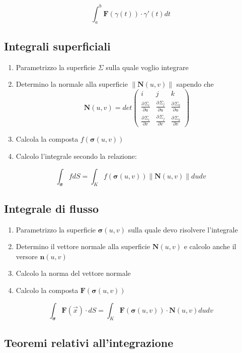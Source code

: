 \documentclass[10pt,a4paper]{report}
\newcommand{\pdv}[3]{\frac{\partial^{#2} #1}{\partial #3^{#2}}}
\newcommand{\norm}[1]{\left\lVert {#1} \right\rVert}
\begin{document}
		\[ \int_{a}^{b} \mathbf{F}(\gamma (t)) \cdot \gamma '(t) dt \]
		
		\subsection*{Integrali \textbf{superficiali}}
			\begin{enumerate}
				\item Parametrizzo la superficie $ \Sigma $ sulla quale voglio integrare
				\item Determino la normale alla superficie $\norm{\mathbf{N}(u,v)} $ sapendo che
                \[ \mathbf{N}(u,v) = det \left(\begin{array}{ccc} i & j & k\\ \pdv{\Sigma_{i} }{}{u} & \pdv{\Sigma_{j}}{}{u} & \pdv{\Sigma_{k}}{}{u} \\ \pdv{\Sigma_{i}}{}{v} & \pdv{\Sigma_{j}}{}{v} & \pdv{\Sigma_{k}}{}{v} \end{array}\right) \]
				\item Calcola la composta $f(\mathbf{\sigma} (u,v))$
				\item Calcolo l'integrale secondo la relazione:
			\end{enumerate}
		\[ \int_{\mathbf{\sigma}} fdS = \int_{K} f(\mathbf{\sigma} (u,v)) \norm{\mathbf{N}(u,v)}dudv \]
		
		\subsection*{Integrale di \textbf{flusso}}
		
		\begin{enumerate}
			\item Parametrizzo la superficie $ \mathbf{\sigma}(u,v) $ sulla quale devo risolvere l'integrale 
			\item Determino il vettore normale alla superficie $ \mathbf{N}(u,v) $ e calcolo anche il versore $ \mathbf{n}(u,v) $
			\item Calcolo la norma del vettore normale 
			\item Calcolo la composta $ \mathbf{F}(\mathbf{\sigma}(u,v)) $
		\end{enumerate}
		
		\[  \int_{\mathbf{\sigma}} \mathbf{F}(\vec{x}) \cdot dS = \int_{K} \mathbf{F}(\mathbf{\sigma}(u,v)) \cdot \mathbf{N}(u,v) dudv\]
		
		\subsection*{Teoremi relativi all'integrazione}
		
\end{document}
